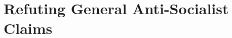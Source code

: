 \chapter{Refuting General Anti-Socialist Claims}
\vfill
\pagebreak
{}

\printbibliography[heading=sources]
